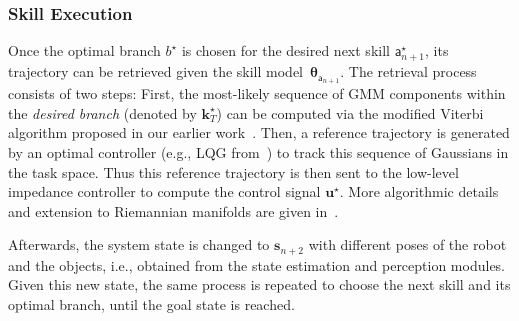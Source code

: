 \subsubsection{Skill Execution}\label{subsubsec:skill-execution}
Once the optimal branch $b^\star$ is chosen for the desired next skill $\mathsf{a}^\star_{n+1}$, 
its trajectory can be retrieved given the skill model~$\boldsymbol{\theta}_{\mathsf{a}_{n+1}}$. 
The retrieval process consists of two steps: First, 
the most-likely sequence of GMM components  within the \emph{desired branch} (denoted by $\boldsymbol{k}^\star_T$) can be computed via the modified Viterbi algorithm proposed in our earlier work~\cite{rozo2020learning}.
Then, a reference trajectory is generated by an optimal controller (e.g., LQG from~\cite{sciavicco2012modelling}) to track this sequence of Gaussians in the task space.
Thus this reference trajectory is then sent to the low-level impedance controller to compute the control signal $\boldsymbol{u}^\star$.
More algorithmic details and extension to Riemannian manifolds are given in~\cite{rozo2020learning}. 


Afterwards, the system state is changed to $\mathbf{s}_{n+2}$ with different poses of the robot and the objects, i.e., obtained from  the  state estimation and perception modules. 
Given this new state, the same process is repeated to choose the next skill and its optimal branch, until the goal state is reached.



